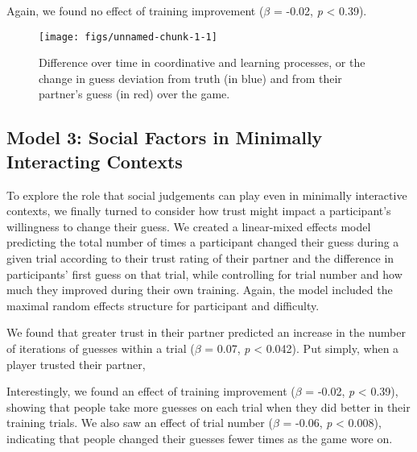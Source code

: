 \documentclass[10pt, letterpaper]{article}
\newenvironment{CodeChunk}{}{}
\begin{document}
Again, we found no effect of training improvement (\emph{\(\beta\)} =
-0.02, \emph{p} \textless{} 0.39).

\begin{CodeChunk}
\begin{figure}[H]

\texttt{[image: figs/unnamed-chunk-1-1]} \hfill{}

\caption[Difference over time in coordinative and learning processes, or the change in guess deviation from truth (in blue) and from their partner's guess (in red) over the game]{Difference over time in coordinative and learning processes, or the change in guess deviation from truth (in blue) and from their partner's guess (in red) over the game.}\label{fig:unnamed-chunk-1}
\end{figure}
\end{CodeChunk}

\subsection{Model 3: Social Factors in Minimally Interacting
Contexts}\label{model-3-social-factors-in-minimally-interacting-contexts}

To explore the role that social judgements can play even in minimally
interactive contexts, we finally turned to consider how trust might
impact a participant's willingness to change their guess. We created a
linear-mixed effects model predicting the total number of times a
participant changed their guess during a given trial according to their
trust rating of their partner and the difference in participants' first
guess on that trial, while controlling for trial number and how much
they improved during their own training. Again, the model included the
maximal random effects structure for participant and difficulty.

We found that greater trust in their partner predicted an increase in
the number of iterations of guesses within a trial (\emph{\(\beta\)} =
0.07, \emph{p} \textless{} 0.042). Put simply, when a player trusted
their partner,

Interestingly, we found an effect of training improvement
(\emph{\(\beta\)} = -0.02, \emph{p} \textless{} 0.39), showing that
people take more guesses on each trial when they did better in their
training trials. We also saw an effect of trial number (\emph{\(\beta\)}
= -0.06, \emph{p} \textless{} 0.008), indicating that people changed
their guesses fewer times as the game wore on.
\end{document}
